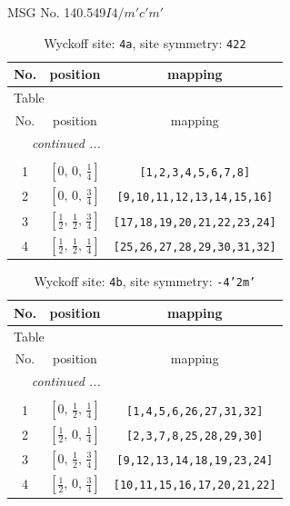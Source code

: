 \documentclass[fleqn,8pt]{jsarticle}
\begin{document}
\setcounter{MaxMatrixCols}{32}

\renewcommand{\tablename}{Table~}
\renewcommand{\figurename}{Figure~}
\begin{center}
\LARGE
MSG No. 140.549\quad$I4/m'c'm'$
\end{center}
\renewcommand{\arraystretch}{1.2}
\begin{longtable}{ccc}
\caption{Wyckoff site: {\tt 4a}, site symmetry: {\tt 422}}
 \\
 \hline \hline
No. & position & mapping \\ \hline \endfirsthead

\multicolumn{2}{l}{\tablename\ \thetable{}} \\
 \hline \hline
No. & position & mapping \\ \hline \endhead

 \hline \hline
\multicolumn{2}{r}{\footnotesize\it continued ...} \\ \endfoot

 \hline \hline
\multicolumn{2}{r}{} \\ \endlastfoot

1 & $\left[ 0,\, 0,\, \frac{1}{4} \right]$ & {\tt [1,2,3,4,5,6,7,8]} \\ \hline
2 & $\left[ 0,\, 0,\, \frac{3}{4} \right]$ & {\tt [9,10,11,12,13,14,15,16]} \\ \hline
3 & $\left[ \frac{1}{2},\, \frac{1}{2},\, \frac{3}{4} \right]$ & {\tt [17,18,19,20,21,22,23,24]} \\ \hline
4 & $\left[ \frac{1}{2},\, \frac{1}{2},\, \frac{1}{4} \right]$ & {\tt [25,26,27,28,29,30,31,32]} \\
\end{longtable}
\renewcommand{\arraystretch}{1.2}
\begin{longtable}{ccc}
\caption{Wyckoff site: {\tt 4b}, site symmetry: {\tt -4'2m'}}
 \\
 \hline \hline
No. & position & mapping \\ \hline \endfirsthead

\multicolumn{2}{l}{\tablename\ \thetable{}} \\
 \hline \hline
No. & position & mapping \\ \hline \endhead

 \hline \hline
\multicolumn{2}{r}{\footnotesize\it continued ...} \\ \endfoot

 \hline \hline
\multicolumn{2}{r}{} \\ \endlastfoot

1 & $\left[ 0,\, \frac{1}{2},\, \frac{1}{4} \right]$ & {\tt [1,4,5,6,26,27,31,32]} \\ \hline
2 & $\left[ \frac{1}{2},\, 0,\, \frac{1}{4} \right]$ & {\tt [2,3,7,8,25,28,29,30]} \\ \hline
3 & $\left[ 0,\, \frac{1}{2},\, \frac{3}{4} \right]$ & {\tt [9,12,13,14,18,19,23,24]} \\ \hline
4 & $\left[ \frac{1}{2},\, 0,\, \frac{3}{4} \right]$ & {\tt [10,11,15,16,17,20,21,22]} \\
\end{longtable}
\end{document}
